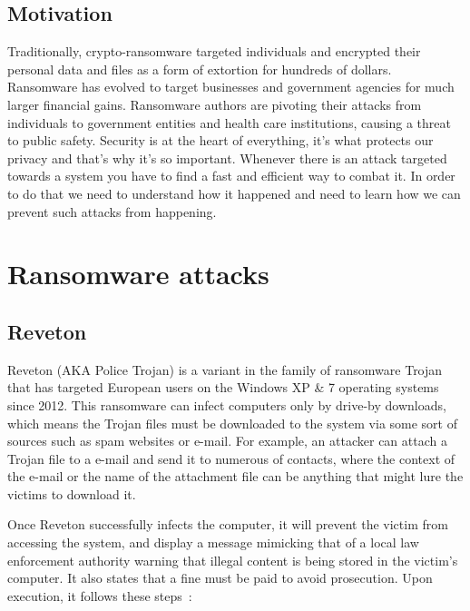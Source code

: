 \documentclass[10pt,a4paper]{article}
\begin{document}
\subsection{Motivation}
Traditionally, crypto-ransomware targeted individuals and encrypted their personal data and files as a form of extortion for hundreds of dollars. Ransomware has evolved to target businesses and government agencies for much larger financial gains. Ransomware authors are pivoting their attacks from individuals to government entities and health care institutions, causing a threat to public safety. Security is at the heart of everything, it's what protects our privacy and that's why it's so important. Whenever there is an attack targeted towards a system you have to find a fast and efficient way to combat it. In order to do that we need to understand how it happened and need to learn how we can prevent such attacks from happening.

\section{Ransomware attacks}

\subsection{Reveton}
Reveton (AKA Police Trojan) is a variant in the family of ransomware Trojan that has targeted European users on the Windows XP \& 7 operating systems since 2012. This ransomware can infect computers only by drive-by downloads, which means the Trojan files must be downloaded to the system via some sort of sources such as spam websites or e-mail. For example, an attacker can attach a Trojan file to a e-mail and send it to numerous of contacts, where the context of the e-mail or the name of the attachment file can be anything that might lure the victims to download it.

Once Reveton successfully infects the computer, it will prevent the victim from accessing the system, and display a message mimicking that of a local law enforcement authority warning that illegal content is being stored in the victim’s computer. It also states that a fine must be paid to avoid prosecution.
Upon execution, it follows these steps~\cite{revetonanalysis}:
\end{document}
